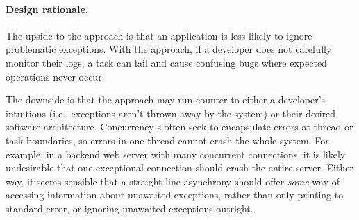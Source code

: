 \paragraph{Design rationale.} The upside to the \destruct approach is that an application is less likely to ignore problematic exceptions. With the \never approach, if a developer does not carefully monitor their logs, a task can fail and cause confusing bugs where expected operations never occur.

The downside is that the \destruct approach may run counter to either a developer's intuitions (i.e., exceptions aren't thrown away by the system) or their desired software architecture. Concurrency s often seek to encapsulate errors at thread or task boundaries, so errors in one thread cannot crash the whole system. For example, in a backend web server with many concurrent connections, it is likely undesirable that one exceptional connection should crash the entire server. Either way, it seems sensible that a straight-line asynchrony  should offer \emph{some} way of accessing information about unawaited exceptions, rather than only printing to standard error, or ignoring unawaited exceptions outright.
